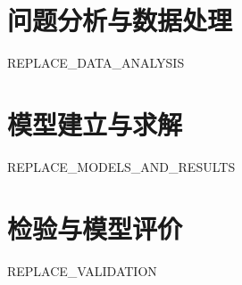 \section{问题分析与数据处理}
REPLACE\_DATA\_ANALYSIS

\section{模型建立与求解}
REPLACE\_MODELS\_AND\_RESULTS

\section{检验与模型评价}
REPLACE\_VALIDATION
